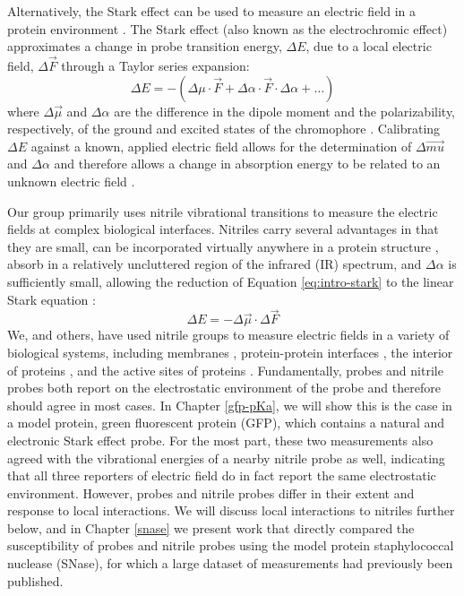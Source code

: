 Alternatively, the Stark effect can be used to measure an electric field in a protein environment \cite{Slocum2018, Fried2015, Blasiak2017}. 
The Stark effect (also known as the electrochromic effect) approximates a change in probe transition energy, $\Delta E$, due to a local electric field, $\Delta \vec{F}$ through a Taylor series expansion:
\begin{equation}
    \Delta E = -(\Delta \mu \cdot \vec{F} + \Delta \alpha \cdot \vec{F} \cdot \Delta \alpha + \ldots)
    \label{eq:intro-stark}
\end{equation}
where $\Delta \vec{\mu}$ and $\Delta \alpha$ are the difference in the dipole moment and the polarizability, respectively, of the ground and excited states of the chromophore \cite{Stark1913}. 
Calibrating $\Delta E$ against a known, applied electric field allows for the determination of $\Delta \vec{mu}$ and $\Delta \alpha$ and therefore allows a change in absorption energy to be related to an unknown electric field \cite{Boxer2009,Fried2015}. 

Our group primarily uses nitrile vibrational transitions to measure the electric fields at complex biological interfaces. 
Nitriles carry several advantages in that they are small, can be incorporated virtually anywhere in a protein structure \cite{Fafarman2006, Getahun2003, Kirshenbaum2002}, absorb in a relatively uncluttered region of the infrared (IR) spectrum, and $\Delta \alpha$ is sufficiently small, allowing the reduction of Equation \ref{eq:intro-stark} to the linear Stark equation \cite{Webb2008}: 
\begin{equation} 
    \Delta E = - \Delta \vec{\mu} \cdot \Delta \vec{F}
    \label{eq:intro-vse}
\end{equation}
We, and others, have used nitrile groups to measure electric fields in a variety of biological systems, including membranes \cite{Shrestha2015, Shrestha2017}, protein-protein interfaces \cite{Stafford2010, Stafford2012, Novelli2018}, the interior of proteins \cite{Slocum2016, Slocum2017, First2018}, and the active sites of proteins \cite{Webb2008, Fafarman2012}. 
Fundamentally, \pKa{} probes and nitrile probes both report on the electrostatic environment of the probe and therefore should agree in most cases. 
In Chapter \ref{gfp-pKa}, we will show this is the case in a model protein, green fluorescent protein (GFP), which contains a natural \pKa{} and electronic Stark effect probe. 
For the most part, these two measurements also agreed with the vibrational energies of a nearby nitrile probe as well, indicating that all three reporters of electric field do in fact report the same electrostatic environment. 
However, \pKa{} probes and nitrile probes differ in their extent and response to local interactions. 
We will discuss local interactions to nitriles further below, and in Chapter \ref{snase} we present work that directly compared the susceptibility of \pKa{} probes and nitrile probes using the model protein staphylococcal nuclease (SNase), for which a large dataset of \pKa{} measurements had previously been published. 

